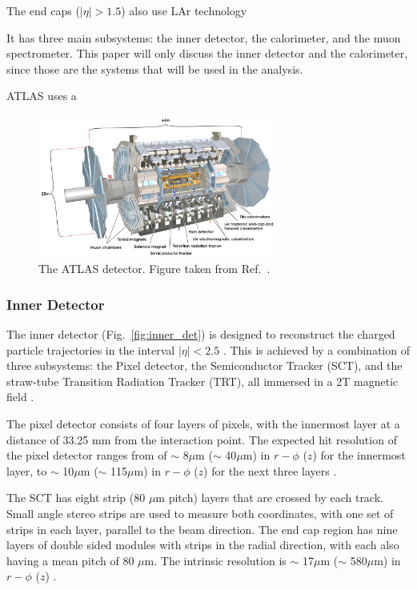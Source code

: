 The end caps ($|\eta| > 1.5$) also use LAr technology 


It has three main subsystems: the inner detector, the calorimeter, and the muon spectrometer. This paper will only discuss the inner detector and the calorimeter, since those are the systems that will be used in the analysis.


ATLAS uses a 

\begin{figure}[ht]
	\centering
	\includegraphics[width=0.7\textwidth]{figures/atlas.pdf} %
	\caption{The ATLAS detector. Figure taken from Ref.~\cite{Aad:2008zzm}.}	
	\label{fig:atlas}%
\end{figure}


\subsubsection{Inner Detector}
The inner detector (Fig.~\ref{fig:inner_det}) is designed to reconstruct the charged particle trajectories in the interval $|\eta| < 2.5$ . This is achieved by a combination of three subsystems: the Pixel detector, the Semiconductor Tracker (SCT), and the straw-tube Transition Radiation Tracker (TRT), all immersed in a 2T magnetic field \cite{Aad:2008zzm}.

The pixel detector consists of four layers of pixels, with the innermost layer at a distance of 33.25 mm from the interaction point. The expected hit resolution of the pixel detector ranges from of $\sim$ 8$\mu$m ($\sim$ 40$\mu$m) in $r-\phi$ ($z$) \cite{ibl_design} for the innermost layer, to $\sim$ 10$\mu$m ($\sim$ 115$\mu$m) in $r-\phi$ ($z$) for the next three layers \cite{Aad:2008zzm}.

The SCT has eight strip (80 $\mu$m pitch) layers that are crossed by each track. Small angle stereo strips are used to measure both coordinates, with one set of strips in each layer, parallel to the beam direction. The end cap region has nine layers of double sided modules with strips in the radial direction, with each also having a mean pitch of 80 $\mu$m. The intrinsic resolution is $\sim$ 17$\mu$m ($\sim$ 580$\mu$m) in $r-\phi$ ($z$)  \cite{Aad:2008zzm}.

